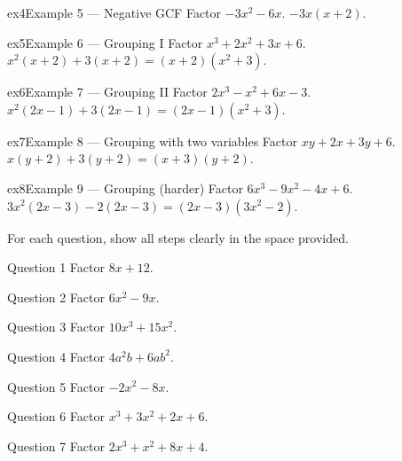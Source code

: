 \documentclass[11pt]{article}
\begin{document}
\begin{example}{ex4}{Example 5 --- Negative GCF}
Factor $-3x^2-6x$.
\soln $-3x(x+2).$
\end{example}

\begin{example}{ex5}{Example 6 --- Grouping I}
Factor $x^3+2x^2+3x+6$.
\soln $x^2(x+2)+3(x+2)=(x+2)(x^2+3).$
\end{example}

\begin{example}{ex6}{Example 7 --- Grouping II}
Factor $2x^3-x^2+6x-3$.
\soln $x^2(2x-1)+3(2x-1)=(2x-1)(x^2+3).$
\end{example}

\begin{example}{ex7}{Example 8 --- Grouping with two variables}
Factor $xy+2x+3y+6$.
\soln $x(y+2)+3(y+2)=(x+3)(y+2).$
\end{example}

\begin{example}{ex8}{Example 9 --- Grouping (harder)}
Factor $6x^3-9x^2-4x+6$.
\soln $3x^2(2x-3)-2(2x-3)=(2x-3)(3x^2-2).$
\end{example}

\clearpage
{}
For each question, show all steps clearly in the space provided.

\begin{qbox}{Question 1}
Factor $8x+12$.\workspace{1.8cm}
\end{qbox}

\begin{qbox}{Question 2}
Factor $6x^2-9x$.\workspace{1.8cm}
\end{qbox}

\begin{qbox}{Question 3}
Factor $10x^3+15x^2$.\workspace{1.8cm}
\end{qbox}

\begin{qbox}{Question 4}
Factor $4a^2b+6ab^2$.\workspace{2.0cm}
\end{qbox}

\begin{qbox}{Question 5}
Factor $-2x^2-8x$.\workspace{1.8cm}
\end{qbox}

\begin{qbox}{Question 6}
Factor $x^3+3x^2+2x+6$.\workspace{2.2cm}
\end{qbox}

\begin{qbox}{Question 7}
Factor $2x^3+x^2+8x+4$.\workspace{2.2cm}
\end{qbox}
\end{document}

